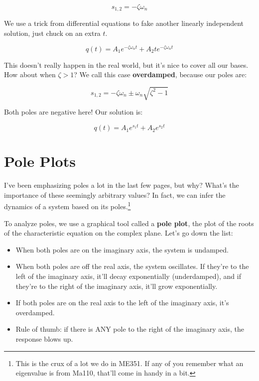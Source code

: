 \documentclass{report}
\begin{document}
\begin{onehalfspacing}
\begin{flushleft}
\vspace{-0.1in}
\[s_{1, 2} = -\zeta \omega_n\]

We use a trick from differential equations to fake another linearly independent solution, just chuck on an extra \(t\).

\vspace{-0.1in}
\[q(t) = A_1 e^{-\zeta \omega_n t} + A_2 t e^{-\zeta \omega_n t}\]

This doesn't really happen in the real world, but it's nice to cover all our bases. How about when \(\zeta > 1\)? We call this case \textbf{overdamped}, because our poles are:

\vspace{-0.1in}
\[s_{1, 2} = -\zeta \omega_n \pm \omega_n \sqrt{\zeta^2 - 1}\]

Both poles are negative here! Our solution is:

\vspace{-0.1in}
\[q(t) = A_1 e^{s_1 t} + A_2 e^{s_2 t}\]

\section{Pole Plots}

I've been emphasizing poles a lot in the last few pages, but why? What's the importance of these seemingly arbitrary values? In fact, we can infer the dynamics of a system based on its poles.\footnote{This is the crux of a lot we do in ME351. If any of you remember what an eigenvalue is from Ma110, that'll come in handy in a bit.}

\medskip

To analyze poles, we use a graphical tool called a \textbf{pole plot}, the plot of the roots of the characteristic equation on the complex plane. Let's go down the list:

\begin{itemize}[noitemsep]
    \item When both poles are on the imaginary axis, the system is undamped.
    \item When both poles are off the real axis, the system oscillates. If they're to the left of the imaginary axis, it'll decay exponentially (underdamped), and if they're to the right of the imaginary axis, it'll grow exponentially.
    \item If both poles are on the real axis to the left of the imaginary axis, it's overdamped.
    \item Rule of thumb: if there is ANY pole to the right of the imaginary axis, the response blows up.
\end{itemize}


\end{flushleft}
\end{onehalfspacing}
\end{document}
